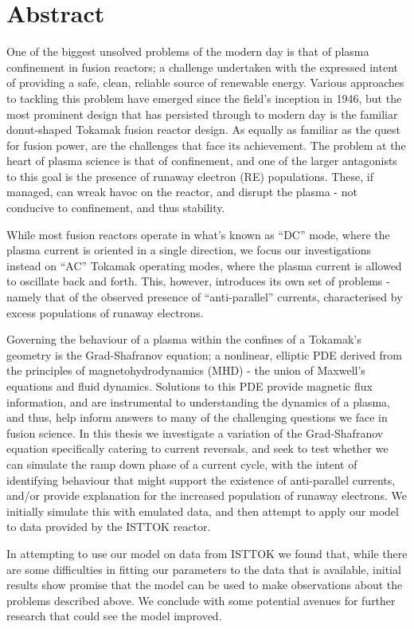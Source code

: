\chapter*{Abstract}\label{abstract}


One of the biggest unsolved problems of the modern day is that of plasma confinement in fusion reactors; a challenge 
undertaken with the expressed intent of providing a safe, clean, reliable source of renewable energy. Various approaches 
to tackling this problem have emerged since the field's inception in 1946, but the most prominent design that has 
persisted through to modern day is the familiar donut-shaped Tokamak fusion reactor design. As equally as familiar as 
the quest for fusion power, are the challenges that face its achievement. The problem at the heart of plasma science is that 
of confinement, and one of the larger antagonists to this goal is the presence of runaway electron (RE) populations. 
These, if managed, can wreak havoc on the reactor, and disrupt the plasma - not conducive to confinement, and thus 
stability.

While most fusion reactors operate in what's known as ``DC'' mode, where the plasma current is oriented in a single direction, 
we focus our investigations instead on ``AC'' Tokamak operating modes, where the plasma current is allowed to oscillate 
back and forth. This, however, introduces its own set of problems - namely that of the observed presence of ``anti-parallel'' 
currents, characterised by excess populations of runaway electrons. 

Governing the behaviour of a plasma within the confines of a Tokamak's geometry is the Grad-Shafranov equation; a nonlinear, 
elliptic PDE derived from the principles of magnetohydrodynamics (MHD) - the union of Maxwell's equations and fluid dynamics. 
Solutions to this PDE provide magnetic flux information, and are instrumental to understanding the dynamics of a plasma, and thus, 
help inform answers to many of the challenging questions we face in fusion science. In this thesis we investigate a variation of 
the Grad-Shafranov equation specifically catering to current reversals, and seek to test whether we can simulate the ramp down phase 
of a current cycle, with the intent of identifying behaviour that might support the existence of anti-parallel currents, and/or 
provide explanation for the increased population of runaway electrons. We initially simulate this with emulated data, and then 
attempt to apply our model to data provided by the ISTTOK reactor.

In attempting to use our model on data from ISTTOK we found that, while there are some difficulties in 
fitting our parameters to the data that is available, initial results show promise that the model can be used to 
make observations about the problems described above. We conclude with some potential avenues for further research that 
could see the model improved.

